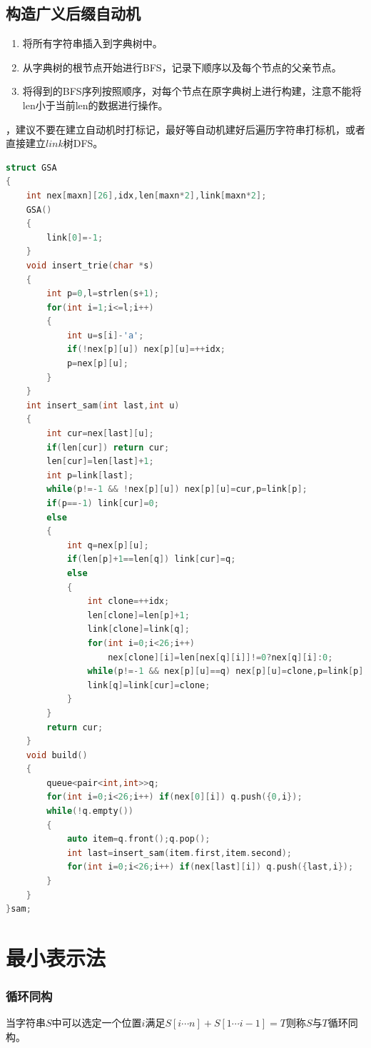 \documentclass[a4paper]{book}
\begin{document}
\subsection{构造广义后缀自动机}
\begin{enumerate}
    \item 将所有字符串插入到字典树中。
    \item 从字典树的根节点开始进行BFS，记录下顺序以及每个节点的父亲节点。
    \item 将得到的BFS序列按照顺序，对每个节点在原字典树上进行构建，注意不能将len小于当前len的数据进行操作。
\end{enumerate}
，建议不要在建立自动机时打标记，最好等自动机建好后遍历字符串打标机，或者直接建立$link$树DFS。
\begin{lstlisting}[language=c++]
struct GSA
{
    int nex[maxn][26],idx,len[maxn*2],link[maxn*2];
    GSA()
    {
        link[0]=-1;
    }
    void insert_trie(char *s)
    {
        int p=0,l=strlen(s+1);
        for(int i=1;i<=l;i++)
        {
            int u=s[i]-'a';
            if(!nex[p][u]) nex[p][u]=++idx;
            p=nex[p][u];
        }
    }
    int insert_sam(int last,int u)
    {
        int cur=nex[last][u];
        if(len[cur]) return cur;
        len[cur]=len[last]+1;
        int p=link[last];
        while(p!=-1 && !nex[p][u]) nex[p][u]=cur,p=link[p];
        if(p==-1) link[cur]=0;
        else 
        {
            int q=nex[p][u];
            if(len[p]+1==len[q]) link[cur]=q;
            else
            {
                int clone=++idx;
                len[clone]=len[p]+1;
                link[clone]=link[q];
                for(int i=0;i<26;i++) 
                    nex[clone][i]=len[nex[q][i]]!=0?nex[q][i]:0;
                while(p!=-1 && nex[p][u]==q) nex[p][u]=clone,p=link[p];
                link[q]=link[cur]=clone;
            }
        }
        return cur;
    }
    void build()
    {
        queue<pair<int,int>>q;
        for(int i=0;i<26;i++) if(nex[0][i]) q.push({0,i});
        while(!q.empty())
        {
            auto item=q.front();q.pop();
            int last=insert_sam(item.first,item.second);
            for(int i=0;i<26;i++) if(nex[last][i]) q.push({last,i});
        }
    }
}sam;
\end{lstlisting}
\section{最小表示法}
\subsubsection{循环同构}
当字符串$S$中可以选定一个位置$i$满足$S[i\cdots n]+S[1\cdots i-1]=T$则称$S$与$T$循环同构。
\end{document}
